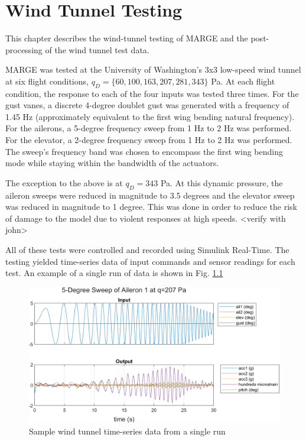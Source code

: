 \chapter{Wind Tunnel Testing}
\label{ch:windTunnel}
\label{sec:wtDAQ}

This chapter describes the wind-tunnel testing of MARGE and the post-processing of the wind tunnel test data.

MARGE was tested at the University of Washington's 3x3 low-speed wind tunnel at six flight conditions, $q_D=\{60,100,163,207,281,343\}$ Pa. At each flight condition, the response to each of the four inputs was tested three times. For the gust vanes, a discrete 4-degree doublet gust was generated with a frequency of 1.45 Hz (approximately equivalent to the first wing bending natural frequency). For the ailerons, a 5-degree frequency sweep from 1 Hz to 2 Hz was performed. For the elevator, a 2-degree frequency sweep from 1 Hz to 2 Hz was performed. The sweep's frequency band was chosen to encompass the first wing bending mode while staying within the bandwidth of the actuators.

The exception to the above is at $q_D=343$ Pa. At this dynamic pressure, the aileron sweeps were reduced in magnitude to 3.5 degrees and the elevator sweep was reduced in magnitude to 1 degree. This was done in order to reduce the risk of damage to the model due to violent responses at high speeds. <verify with john>

All of these tests were controlled and recorded using Simulink Real-Time. The testing yielded time-series data of input commands and sensor readings for each test. An example of a single run of data is shown in Fig. \ref{fig:sampleWT}
\begin{figure}[H]
	\centering
	\label{fig:sampleWT}
	\includegraphics[width=6in]{figs/sampleWT.png}
	\caption{Sample wind tunnel time-series data from a single run}
\end{figure}

